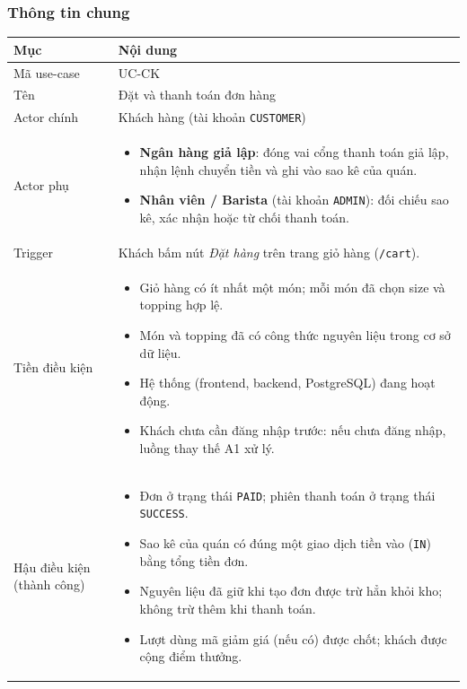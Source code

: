 \subsubsection{Thông tin chung}

\begin{longtable}{@{}p{3.6cm}p{12.4cm}@{}}
\toprule
\textbf{Mục} & \textbf{Nội dung} \\
\midrule
\endhead
Mã use-case & UC-CK \\
Tên & Đặt và thanh toán đơn hàng \\
Actor chính & Khách hàng (tài khoản \texttt{CUSTOMER}) \\
Actor phụ &
  \begin{itemize}[leftmargin=*]
    \item \textbf{Ngân hàng giả lập}: đóng vai cổng thanh toán giả lập, nhận lệnh chuyển tiền và ghi vào sao kê của quán.
    \item \textbf{Nhân viên / Barista} (tài khoản \texttt{ADMIN}): đối chiếu sao kê, xác nhận hoặc từ chối thanh toán.
  \end{itemize} \\
Trigger & Khách bấm nút \emph{Đặt hàng} trên trang giỏ hàng (\texttt{/cart}). \\
Tiền điều kiện &
  \begin{itemize}[leftmargin=*]
    \item Giỏ hàng có ít nhất một món; mỗi món đã chọn size và topping hợp lệ.
    \item Món và topping đã có công thức nguyên liệu trong cơ sở dữ liệu.
    \item Hệ thống (frontend, backend, PostgreSQL) đang hoạt động.
    \item Khách chưa cần đăng nhập trước: nếu chưa đăng nhập, luồng thay thế A1 xử lý.
  \end{itemize} \\
Hậu điều kiện (thành công) &
  \begin{itemize}[leftmargin=*]
    \item Đơn ở trạng thái \texttt{PAID}; phiên thanh toán ở trạng thái \texttt{SUCCESS}.
    \item Sao kê của quán có đúng một giao dịch tiền vào (\texttt{IN}) bằng tổng tiền đơn.
    \item Nguyên liệu đã giữ khi tạo đơn được trừ hẳn khỏi kho; không trừ thêm khi thanh toán.
    \item Lượt dùng mã giảm giá (nếu có) được chốt; khách được cộng điểm thưởng.

\end{itemize}
\end{longtable}

